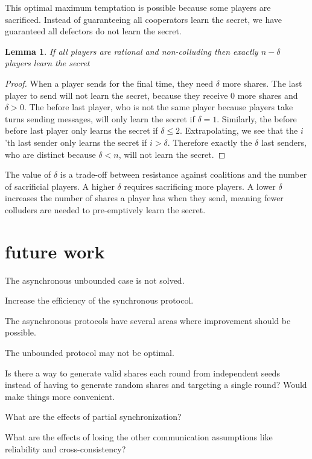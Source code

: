 \documentclass{dalcsthesis}
\newtheorem{lemma}{Lemma}
\begin{document}
This optimal maximum temptation is possible because some players are sacrificed. Instead of guaranteeing all cooperators learn the secret, we have guaranteed all defectors do not learn the secret.

\begin{lemma} If all players are rational and non-colluding then exactly $n - \delta$ players learn the secret \end{lemma}
\begin{proof}
When a player sends for the final time, they need $\delta$ more shares. The last player to send will not learn the secret, because they receive 0 more shares and $\delta > 0$. The before last player, who is not the same player because players take turns sending messages, will only learn the secret if $\delta = 1$. Similarly, the before before last player only learns the secret if $\delta \leq 2$. Extrapolating, we see that the $i$'th last sender only learns the secret if $i > \delta$. Therefore exactly the $\delta$ last senders, who are distinct because $\delta < n$, will not learn the secret.
\end{proof}

The value of $\delta$ is a trade-off between resistance against coalitions and the number of sacrificial players. A higher $\delta$ requires sacrificing more players. A lower $\delta$ increases the number of shares a player has when they send, meaning fewer colluders are needed to pre-emptively learn the secret.

\chapter{future work}

The asynchronous unbounded case is not solved.

Increase the efficiency of the synchronous protocol.

The asynchronous protocols have several areas where improvement should be possible.

The unbounded protocol may not be optimal.

Is there a way to generate valid shares each round from independent seeds instead of having to generate random shares and targeting a single round? Would make things more convenient.

What are the effects of partial synchronization?

What are the effects of losing the other communication assumptions like reliability and cross-consistency?
\end{document}
